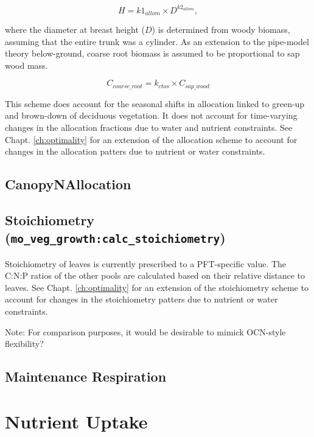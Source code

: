 \begin{equation}
H = k1_{allom} \times D^{k2_{allom}},
\end{equation}

where the diameter at breast height ($D$) is determined from woody biomass, assuming that the entire trunk was a cylinder. As an extension to the pipe-model theory below-ground, coarse root biomass is assumed to be proportional to sap wood mass. 

\begin{equation}
C_{coarse\_root} = k_{ctos} \times C_{sap\_wood}
\end{equation}

This scheme does account for the seasonal shifts in allocation linked to green-up and brown-down of deciduous vegetation. It does not account for time-varying changes in the allocation fractions due to water and nutrient constraints. See Chapt. \ref{ch:optimality} for an extension of the allocation scheme to account for changes in the allocation patters due to nutrient or water constraints. 

\subsection{CanopyNAllocation}\label{sec:veg:foliar_N_fractions}\label{sec:veg:canopy}

\subsection{Stoichiometry (\texttt{mo\_veg\_growth:calc\_stoichiometry})}\label{sec:Stoichem}

Stoichiometry of leaves is currently prescribed to a PFT-specific value. The C:N:P ratios of the other pools are calculated based on their relative distance to leaves. See Chapt. \ref{ch:optimality} for an extension of the stoichiometry scheme to account for changes in the stoichiometry patters due to nutrient or water constraints. 

Note: For comparison purposes, it would be desirable to mimick OCN-style flexibility?
\subsection{Maintenance Respiration}\label{sec:veg:MaintResp}

\section{Nutrient Uptake}\label{sec:ResUptake}

